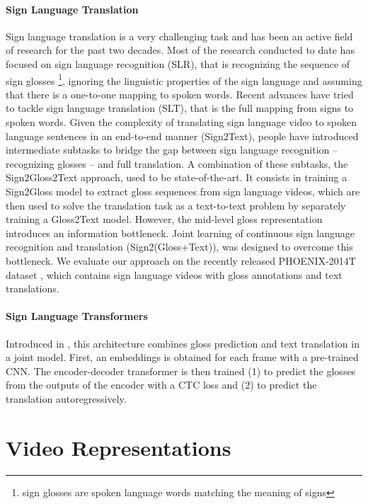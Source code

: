 \documentclass[final]{cvpr}
\begin{document}
\paragraph{Sign Language Translation}Sign language translation is a very challenging task and has been an active field of
research for the past two decades. Most of the research conducted to date has focused on sign language recognition (SLR), that is recognizing the sequence of sign glosses \footnote{sign glosses are spoken language words matching the meaning of signs}, ignoring the linguistic properties of the sign language and assuming that there is a one-to-one mapping to spoken words. Recent advances have tried to tackle sign language translation (SLT), that is the full mapping from signs to spoken words.
Given the complexity of translating sign language video to spoken language sentences in an end-to-end manner (Sign2Text), people have introduced intermediate subtasks to bridge the gap between sign language recognition -- recognizing glosses -- and full translation. A combination of these subtasks, the Sign2Gloss2Text approach, used to be state-of-the-art. It consists in training a Sign2Gloss model to extract gloss sequences from sign language videos, which are then used to solve the translation task as a text-to-text problem by separately training a Gloss2Text model. However, the mid-level gloss representation introduces an information bottleneck. Joint learning of continuous sign language recognition and translation (Sign2(Gloss+Text)), was designed to overcome this bottleneck. We evaluate our approach on the recently released PHOENIX-2014T dataset \cite{phoenix}, which contains sign language videos with gloss annotations and text translations.
\paragraph{Sign Language Transformers}
Introduced in \cite{neccam}, this architecture combines gloss prediction and text translation in a joint model. First, an embeddings is obtained for each frame with a pre-trained CNN. The encoder-decoder transformer is then trained (1) to predict the glosses from the outputs of the encoder with a CTC loss and (2) to predict the translation autoregressively.

\section{Video Representations}
\end{document}
